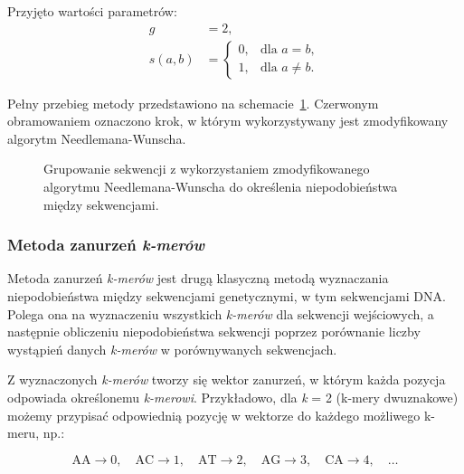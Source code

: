            Przyjęto wartości parametrów:
            \begin{align*}
                g &= 2, \\
                s(a, b) &= \begin{cases}
                    0, & \text{dla } a = b, \\
                    1, & \text{dla } a \neq b.
                \end{cases}
            \end{align*}

            Pełny przebieg metody przedstawiono na schemacie~\ref{Picture:Cluster:NeedlemanWunsch}. Czerwonym obramowaniem oznaczono krok, w którym wykorzystywany jest zmodyfikowany algorytm Needlemana-Wunscha.


            \begin{figure}
                \begin{center}
                    
                \end{center}
                \caption{
                    Grupowanie sekwencji z wykorzystaniem zmodyfikowanego algorytmu Needlemana-Wunscha do określenia niepodobieństwa między sekwencjami.
                }\label{Picture:Cluster:NeedlemanWunsch}
            \end{figure}

        \subsubsection{Metoda zanurzeń \textit{k-merów}}
            Metoda zanurzeń \textit{k-merów} jest drugą klasyczną metodą wyznaczania niepodobieństwa między sekwencjami genetycznymi, w tym sekwencjami DNA. Polega ona na wyznaczeniu wszystkich \textit{k-merów} dla sekwencji wejściowych, a następnie obliczeniu niepodobieństwa sekwencji poprzez porównanie liczby wystąpień danych \textit{k-merów} w porównywanych sekwencjach.

            Z wyznaczonych \textit{k-merów} tworzy się wektor zanurzeń, w którym każda pozycja odpowiada określonemu \textit{k-merowi}. Przykładowo, dla \textit{k} = 2 (k-mery dwuznakowe) możemy przypisać odpowiednią pozycję w wektorze do każdego możliwego k-meru, np.:
            
            \[
            \text{AA} \to 0, \quad \text{AC} \to 1, \quad \text{AT} \to 2, \quad \text{AG} \to 3, \quad \text{CA} \to 4, \quad \dots
            \]
            
